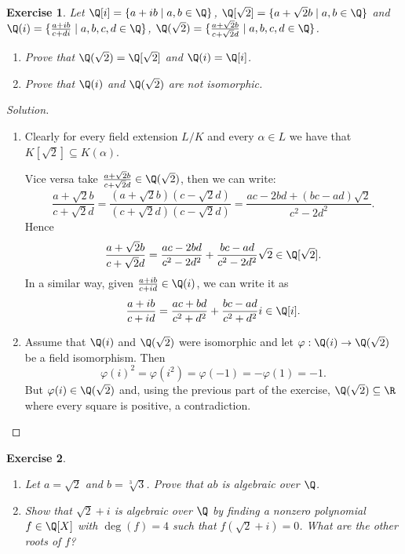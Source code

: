 \documentclass[a4paper,10pt,reqno]{amsart}
\newtheorem{ex}{Exercise}[section]
\newenvironment{sol}
  {\renewcommand\qedsymbol{$\blacksquare$}\begin{proof}[Solution]}
  {\end{proof}}
\begin{document}
\begin{ex}
\label{1.3}
Let $\Q[i]=\{a+ib\mid a,b\in \Q\}$, $\Q[\sqrt{2}]=\{a+\sqrt{2}b\mid a,b\in\Q\}$ and $\Q(i)=\{\frac{a+ib}{c+di}\mid a,b,c,d\in \Q\}$, $\Q(\sqrt{2})=\{\frac{a+\sqrt{2}b}{c+\sqrt{2}d}\mid a,b,c,d\in\Q\}$.

\begin{enumerate}[label=(\roman*)]
    \item Prove that $\Q(\sqrt{2})=\Q[\sqrt{2}]$ and $\Q(i)=\Q[i]$.
    \item Prove that $\Q(i)$ and $\Q(\sqrt{2})$ are not isomorphic.
\end{enumerate}
\end{ex}
\begin{sol}~
\begin{enumerate}[label=(\roman*)]
    \item Clearly for every field extension $L/K$ and 
    every $\alpha\in L$ we have that
    $K[\sqrt{2}]\subseteq K(\alpha)$.

    Vice versa take $\frac{a+\sqrt{2}b}{c+\sqrt{2}d}\in \Q(\sqrt{2})$,
    then we can write:
    \[
    \frac{a+\sqrt{2}b}{c+\sqrt{2}d}=\frac{(a+\sqrt{2}b)(c-\sqrt{2}d)}{(c+\sqrt{2}d)(c-\sqrt{2}d)}=
    \frac{ac-2bd+(bc-ad)\sqrt{2}}{c^2-2d^2}.
    \]
    Hence
    \[
    \frac{a+\sqrt{2}b}{c+\sqrt{2}d}=\frac{ac-2bd}{c^2-2d^2}+\frac{bc-ad}{c^2-2d^2}\sqrt{2}\in \Q[\sqrt{2}].
    \]
    In a similar way, given $\frac{a+ib}{c+id}\in \Q(i)$,
    we can write it as
    \[
    \frac{a+ib}{c+id}=\frac{ac+bd}{c^2+d^2}+\frac{bc-ad}{c^2+d^2}i\in \Q[i].
    \]
    \item Assume that $\Q(i)$ and $\Q(\sqrt{2})$ were isomorphic 
    and let $\varphi:\Q(i)\to \Q(\sqrt{2})$
    be a field isomorphism.
    Then 
    \[
    \varphi(i)^2=
    \varphi(i^2)=
    \varphi(-1)=
    -\varphi(1)=-1.
    \]
    But $\varphi(i)\in\Q(\sqrt{2})$ and,
    using the previous part of the exercise,
    $\Q(\sqrt{2})\subseteq \R$ where every square is positive, a contradiction.\qedhere
\end{enumerate}
    
\end{sol}

\begin{ex}
\label{1.4}~
    \begin{enumerate}[label=(\roman*)]
        \item Let $a=\sqrt{2}$ and $b=\sqrt[3]{3}$. Prove that $ab$ is algebraic over $\Q$.
        \item Show that $\sqrt{2} + i$ is algebraic over $\Q$ by finding a nonzero polynomial $f \in \Q[X]$ with $\deg(f) = 4$ such that $f(\sqrt{2} + i) = 0$. What are the other roots of $f$?
    \end{enumerate}
\end{ex}
\end{document}
